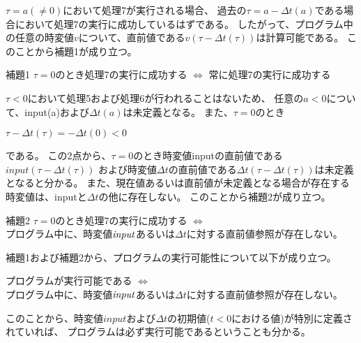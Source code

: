 $\tau = a(\neq 0)$において処理7が実行される場合、
過去の$\tau = a - \Delta t(a)$である場合において処理7の実行に成功しているはずである。
したがって、プログラム中の任意の時変値$v$について、直前値である$v(\tau - \Delta t(\tau))$は計算可能である。
このことから補題1が成り立つ。
\begin{itembox}[l]{補題1}
  $\tau = 0$のとき処理7の実行に成功する $\Longleftrightarrow$ 常に処理7の実行に成功する
\end{itembox}

$\tau < 0$において処理5および処理6が行われることはないため、
任意の$a < 0$について、input(a)および$\Delta t(a)$は未定義となる。
また、$\tau = 0$のとき
\begin{center}
  $\tau - \Delta t(\tau) = -\Delta t(0) < 0$
\end{center}
である。
この2点から、$\tau = 0$のとき時変値inputの直前値である$input(\tau - \Delta t(\tau))$
および時変値$\Delta t$の直前値である$\Delta t(\tau - \Delta t(\tau))$は未定義となると分かる。
また、現在値あるいは直前値が未定義となる場合が存在する時変値は、inputと$\Delta t$の他に存在しない。
このことから補題2が成り立つ。
\begin{itembox}[l]{補題2}
  $\tau = 0$のとき処理7の実行に成功する $\Longleftrightarrow$ \\
  プログラム中に、時変値${\it input}$あるいは$\Delta t$に対する直前値参照が存在しない。
\end{itembox}

補題1および補題2から、プログラムの実行可能性について以下が成り立つ。
\begin{screen}
  プログラムが実行可能である $\Longleftrightarrow$ \\
  プログラム中に、時変値${\it input}$あるいは$\Delta t$に対する直前値参照が存在しない。
\end{screen}

このことから、時変値$input$および$\Delta t$の初期値($t < 0$における値)が特別に定義されていれば、
プログラムは必ず実行可能であるということも分かる。
